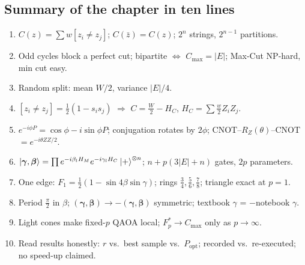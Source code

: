 \documentclass[11pt,a4paper,openany]{book}
\newcommand{\bg}{\boldsymbol\gamma}
\newcommand{\bb}{\boldsymbol\beta}
\begin{document}
\subsection*{Summary of the chapter in ten lines}
\begin{enumerate}[itemsep=1pt]
\item $C(z) = \sum w[z_i\neq z_j]$; $C(\bar z) = C(z)$; $2^n$ strings, $2^{n-1}$ partitions.
\item Odd cycles block a perfect cut; bipartite $\iff$ $C_{\max} = |E|$; Max-Cut NP-hard, min cut easy.
\item Random split: mean $W/2$, variance $|E|/4$.
\item $[z_i\neq z_j] = \frac12(1 - s_is_j)$ $\Rightarrow$ $C = \frac W2 - H_C$, $H_C = \sum\frac w2Z_iZ_j$.
\item $e^{-i\phi P} = \cos\phi - i\sin\phi P$; conjugation rotates by $2\phi$; CNOT--$R_Z(\theta)$--CNOT $= e^{-i\theta ZZ/2}$.
\item $\ket{\bg,\bb} = \prod e^{-i\beta_lH_M}e^{-i\gamma_lH_C}\ket+^{\otimes n}$; $n + p(3|E| + n)$ gates, $2p$ parameters.
\item One edge: $F_1 = \frac12(1 - \sin4\beta\sin\gamma)$; rings $\frac34, \frac56, \frac78$; triangle exact at $p = 1$.
\item Period $\frac\pi2$ in $\beta$; $(\bg,\bb) \to -(\bg,\bb)$ symmetric; textbook $\gamma$ = $-$notebook $\gamma$.
\item Light cones make fixed-$p$ QAOA local; $F_p^* \to C_{\max}$ only as $p \to \infty$.
\item Read results honestly: $r$ vs.\ best sample vs.\ $P_{\text{opt}}$; recorded vs.\ re-executed; no speed-up claimed.
\end{enumerate}
\end{document}
